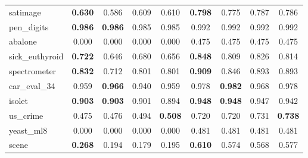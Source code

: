 \begin{figure}[ht]
\begin{tabular}{p{22mm}|*4{p{14mm}}|*4{p{14mm}}}
        satimage&\multicolumn{1}{c}{\textbf{0.630}}&\multicolumn{1}{c}{0.586}&\multicolumn{1}{c}{0.609}&\multicolumn{1}{c|}{0.610}&\multicolumn{1}{c}{\textbf{0.798}}&\multicolumn{1}{c}{0.775}&\multicolumn{1}{c}{0.787}&\multicolumn{1}{c}{0.786}\\
        pen\_digits&\multicolumn{1}{c}{\textbf{0.986}}&\multicolumn{1}{c}{\textbf{0.986}}&\multicolumn{1}{c}{0.985}&\multicolumn{1}{c|}{0.985}&\multicolumn{1}{c}{0.992}&\multicolumn{1}{c}{0.992}&\multicolumn{1}{c}{0.992}&\multicolumn{1}{c}{0.992}\\
        abalone&\multicolumn{1}{c}{0.000}&\multicolumn{1}{c}{0.000}&\multicolumn{1}{c}{0.000}&\multicolumn{1}{c|}{0.000}&\multicolumn{1}{c}{0.475}&\multicolumn{1}{c}{0.475}&\multicolumn{1}{c}{0.475}&\multicolumn{1}{c}{0.475}\\
        sick\_euthyroid&\multicolumn{1}{c}{\textbf{0.722}}&\multicolumn{1}{c}{0.646}&\multicolumn{1}{c}{0.680}&\multicolumn{1}{c|}{0.656}&\multicolumn{1}{c}{\textbf{0.848}}&\multicolumn{1}{c}{0.809}&\multicolumn{1}{c}{0.826}&\multicolumn{1}{c}{0.814}\\
        spectrometer&\multicolumn{1}{c}{\textbf{0.832}}&\multicolumn{1}{c}{0.712}&\multicolumn{1}{c}{0.801}&\multicolumn{1}{c|}{0.801}&\multicolumn{1}{c}{\textbf{0.909}}&\multicolumn{1}{c}{0.846}&\multicolumn{1}{c}{0.893}&\multicolumn{1}{c}{0.893}\\
        car\_eval\_34&\multicolumn{1}{c}{0.959}&\multicolumn{1}{c}{\textbf{0.966}}&\multicolumn{1}{c}{0.940}&\multicolumn{1}{c|}{0.959}&\multicolumn{1}{c}{0.978}&\multicolumn{1}{c}{\textbf{0.982}}&\multicolumn{1}{c}{0.968}&\multicolumn{1}{c}{0.978}\\
        isolet&\multicolumn{1}{c}{\textbf{0.903}}&\multicolumn{1}{c}{\textbf{0.903}}&\multicolumn{1}{c}{0.901}&\multicolumn{1}{c|}{0.894}&\multicolumn{1}{c}{\textbf{0.948}}&\multicolumn{1}{c}{\textbf{0.948}}&\multicolumn{1}{c}{0.947}&\multicolumn{1}{c}{0.942}\\
        us\_crime&\multicolumn{1}{c}{0.475}&\multicolumn{1}{c}{0.476}&\multicolumn{1}{c}{0.494}&\multicolumn{1}{c|}{\textbf{0.508}}&\multicolumn{1}{c}{0.720}&\multicolumn{1}{c}{0.720}&\multicolumn{1}{c}{0.731}&\multicolumn{1}{c}{\textbf{0.738}}\\
        yeast\_ml8&\multicolumn{1}{c}{0.000}&\multicolumn{1}{c}{0.000}&\multicolumn{1}{c}{0.000}&\multicolumn{1}{c|}{0.000}&\multicolumn{1}{c}{0.481}&\multicolumn{1}{c}{0.481}&\multicolumn{1}{c}{0.481}&\multicolumn{1}{c}{0.481}\\
        scene&\multicolumn{1}{c}{\textbf{0.268}}&\multicolumn{1}{c}{0.194}&\multicolumn{1}{c}{0.179}&\multicolumn{1}{c|}{0.195}&\multicolumn{1}{c}{\textbf{0.610}}&\multicolumn{1}{c}{0.574}&\multicolumn{1}{c}{0.568}&\multicolumn{1}{c}{0.577}\\

\end{tabular}
\end{figure}
